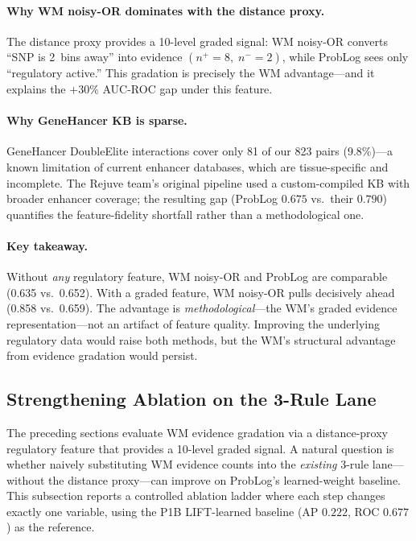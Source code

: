 \documentclass[]{article}
\begin{document}
\paragraph{Why WM noisy-OR dominates with the distance proxy.}
The distance proxy provides a 10-level graded signal: WM noisy-OR converts
``SNP is 2~bins away'' into evidence $(n^+ = 8,\; n^- = 2)$, while ProbLog
sees only ``regulatory active.''  This gradation is precisely the WM
advantage---and it explains the $+30\%$ AUC-ROC gap under this feature.

\paragraph{Why GeneHancer KB is sparse.}
GeneHancer DoubleElite interactions cover only 81 of our 823 pairs
(9.8\%)---a known limitation of current enhancer databases, which are
tissue-specific and incomplete.  The Rejuve team's original pipeline used a
custom-compiled KB with broader enhancer coverage; the resulting gap
(ProbLog $0.675$ vs.\ their $0.790$) quantifies the feature-fidelity
shortfall rather than a methodological one.

\paragraph{Key takeaway.}
Without \emph{any} regulatory feature, WM noisy-OR and ProbLog are
comparable (0.635 vs.\ 0.652).  With a graded feature, WM noisy-OR
pulls decisively ahead (0.858 vs.\ 0.659).  The advantage is
\emph{methodological}---the WM's graded evidence representation---not
an artifact of feature quality.  Improving the underlying
regulatory data would raise both methods, but the WM's structural
advantage from evidence gradation would persist.

\subsection{Strengthening Ablation on the 3-Rule Lane}
\label{sec:strengthening-ablation}

The preceding sections evaluate WM evidence gradation via a
distance-proxy regulatory feature that provides a 10-level graded
signal.  A natural question is whether naively substituting WM
evidence counts into the \emph{existing} 3-rule lane---without the
distance proxy---can improve on ProbLog's learned-weight baseline.
This subsection reports a controlled ablation ladder where each step
changes exactly one variable, using the P1B LIFT-learned baseline
(AP $0.222$, ROC $0.677$) as the reference.
\end{document}
